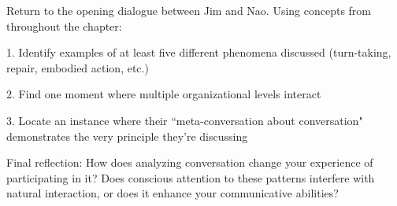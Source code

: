 \begin{tcolorbox}[title=Exercise: Synthesis—Conversation as System, colback=white, colframe=black!75!black, fonttitle=\bfseries]
Return to the opening dialogue between Jim and Nao. Using concepts from throughout the chapter:

1. Identify examples of at least five different phenomena discussed (turn-taking, repair, embodied action, etc.)

2. Find one moment where multiple organizational levels interact

3. Locate an instance where their ``meta-conversation about conversation" demonstrates the very principle they're discussing

Final reflection: How does analyzing conversation change your experience of participating in it? Does conscious attention to these patterns interfere with natural interaction, or does it enhance your communicative abilities?
\end{tcolorbox}
